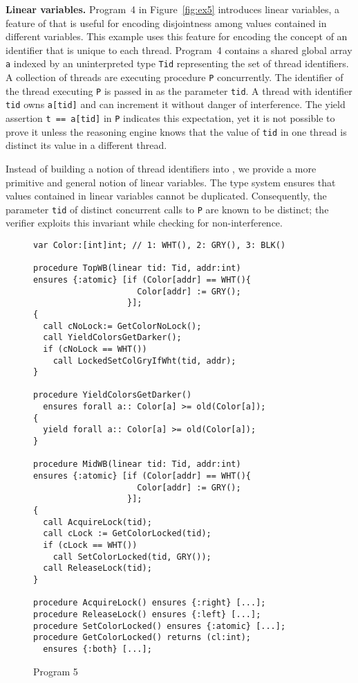 {\bf Linear variables.}
Program~4 in Figure~\ref{fig:ex5} introduces linear variables, a feature of \civl 
that is useful for encoding disjointness among values contained in 
different variables.  
This example uses this feature for encoding the concept of an identifier 
that is unique to each thread.
Program~4 contains a shared global array {\tt a} indexed by an uninterpreted type {\tt Tid} 
representing the set of thread identifiers.
A collection of threads are executing procedure {\tt P} concurrently.
The identifier of the thread executing {\tt P} is passed in as the parameter {\tt tid}.
A thread with identifier {\tt tid} owns {\tt a[tid]} and can increment it without danger of interference.
The yield assertion {\tt t == a[tid]} in {\tt P} indicates this expectation, yet it is not possible to prove it 
unless the reasoning engine knows that the value of {\tt tid} in one thread is distinct 
its value in a different thread.

Instead of building a notion of thread identifiers into \civl, we provide a more 
primitive and general notion of linear variables.
The \civl type system ensures that values contained in linear variables cannot be duplicated.
Consequently, the parameter {\tt tid} of distinct concurrent calls to {\tt P} are known to be distinct;
the \civl verifier exploits this invariant while checking for non-interference.

\begin{figure}
\begin{verbatim}
var Color:[int]int; // 1: WHT(), 2: GRY(), 3: BLK()

procedure TopWB(linear tid: Tid, addr:int)
ensures {:atomic} [if (Color[addr] == WHT(){
                     Color[addr] := GRY();
                   }];
{
  call cNoLock:= GetColorNoLock();
  call YieldColorsGetDarker(); 
  if (cNoLock == WHT()) 
    call LockedSetColGryIfWht(tid, addr);
}

procedure YieldColorsGetDarker()
  ensures forall a:: Color[a] >= old(Color[a]);
{
  yield forall a:: Color[a] >= old(Color[a]);
}

procedure MidWB(linear tid: Tid, addr:int)
ensures {:atomic} [if (Color[addr] == WHT(){
                     Color[addr] := GRY();
                   }];
{
  call AcquireLock(tid);
  call cLock := GetColorLocked(tid);
  if (cLock == WHT()) 
    call SetColorLocked(tid, GRY());
  call ReleaseLock(tid);
}

procedure AcquireLock() ensures {:right} [...];
procedure ReleaseLock() ensures {:left} [...];
procedure SetColorLocked() ensures {:atomic} [...];
procedure GetColorLocked() returns (cl:int);
  ensures {:both} [...];
\end{verbatim}
\caption{Program 5}
\label{fig:reft}
\end{figure}

